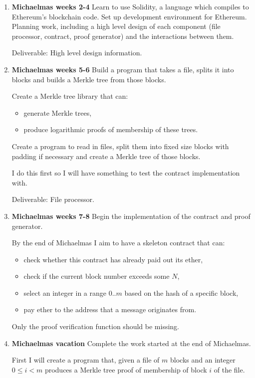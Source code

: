 \documentclass[oneside]{article}
\begin{document}
\begin{enumerate}
\item \textbf{Michaelmas weeks 2-4} Learn to use Solidity, a language which compiles to Ethereum's blockchain code.
Set up development environment for Ethereum.
Planning work, including a high level design of each component (file processor, contract, proof generator) and the interactions between them.

Deliverable: High level design information.

\item \textbf{Michaelmas weeks 5-6} Build a program that takes a file, splits it into blocks and builds a Merkle tree from those blocks.

Create a Merkle tree library that can: 
\begin{itemize}
\item generate Merkle trees,
\item produce logarithmic proofs of membership of these trees.
\end{itemize}
Create a program to read in files, split them into fixed size blocks with padding if necessary and create a Merkle tree of those blocks.

I do this first so I will have something to test the contract implementation with.

Deliverable: File processor.

\item \textbf{Michaelmas weeks 7-8} Begin the implementation of the contract and proof generator.

By the end of Michaelmas I aim to have a skeleton contract that can:
\begin{itemize}
\item check whether this contract has already paid out its ether,
\item check if the current block number exceeds some $N$,
\item select an integer in a range $0..m$ based on the hash of a specific block,
\item pay ether to the address that a message originates from.
\end{itemize}

Only the proof verification function should be missing.

\item \textbf{Michaelmas vacation} Complete the work started at the end of Michaelmas.

First I will create a program that, given a file of $m$ blocks and an integer $0 \leq i < m$ produces a Merkle tree proof of membership of block $i$ of the file.


\end{enumerate}
\end{document}
